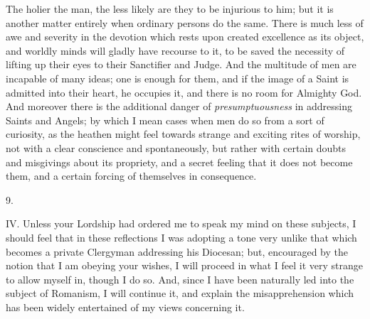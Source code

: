 The holier the man, the less likely are they to be injurious to him;
but it is another matter entirely when ordinary persons do the same.
There is much less of awe and severity in the devotion which rests
upon created excellence as its object, and worldly minds will gladly
have recourse to it, to be saved the necessity of lifting up their
eyes to their Sanctifier and Judge. And the multitude of men are
incapable of many ideas; one is enough for them, and if the image of a
Saint is admitted into their heart, he occupies it, and there is no
room for Almighty God. And moreover there is the additional danger of \emph{presumptuousness}
in addressing Saints and Angels; by which I mean cases when men do so
from a sort of curiosity, as the heathen might feel towards strange
and exciting rites of worship, not with a clear conscience and
spontaneously, but rather with certain doubts and misgivings about its
propriety, and a secret feeling that it does not become them, and a
certain forcing of themselves in consequence.

9.

IV.
Unless your Lordship had ordered me to speak my mind on these
subjects, I should feel that in these reflections I was adopting a
tone very unlike that which becomes a private Clergyman addressing his
Diocesan; but, encouraged by the notion that I am obeying your wishes,
I will proceed in what I feel it very strange to allow myself in,
though I do so. And, since I have been naturally led into the subject
of Romanism, I will continue it, and explain the misapprehension which
has been widely entertained of my views concerning it.


